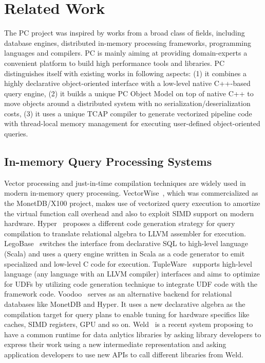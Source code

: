 
\section{Related Work}

The PC project was inspired by works from a broad class of
fields, including database engines, distributed in-memory processing
frameworks,  programming languages and compilers. PC is
mainly aiming at providing domain-experts a convenient platform to build high
performance tools and libraries. PC distinguishes itself with existing
works in following aspects:
(1) it combines a highly declarative object-oriented interface with a
low-level native
C++-based query engine, (2) it builds a unique PC Object Model on top of
native C++ to move objects around a distributed system with no
serialization/deserialization costs, (3) it uses a unique TCAP compiler to generate vectorized
pipeline code with thread-local memory management for executing
user-defined object-oriented queries.

\subsection {In-memory Query Processing Systems}
Vector processing and just-in-time compilation techniques are widely
used in modern in-memory query
processing. VectorWise~\cite{zukowski2012vectorwise}, which was
commercialized as the MonetDB/X100 project, makes use of vectorized
query execution to amortize the virtual function call overhead and
also to exploit SIMD support on modern hardware.
Hyper~\cite{neumann2011efficiently} proposes a different code
generation strategy for query compilation to translate relational
algebra to LLVM assembler for execution.
 LegoBase~\cite{klonatos2014building} switches the interface
from declarative SQL to high-level language (Scala) and uses a query engine
written in Scala as a code generator to emit specialized and low-level
C code for execution. TupleWare~\cite{crotty2015tupleware} supports
high-level language (any language with an LLVM compiler) interfaces
and aims to
optimize for UDFs by utilizing code
generation technique to integrate UDF code with the framework
code. Voodoo~\cite{pirk2016voodoo} serves as an alternative backend for
relational databases like MonetDB and Hyper. It uses a new
declarative algebra as the compilation target for query plans to
enable tuning for hardware specifics like caches, SIMD registers,
GPU and so on. Weld~\cite{palkar2017weld} is a recent system proposing
to have a common runtime for data anlytics libraries by asking library
developers to express their work using a new intermediate
representation and asking application developers to use new APIs to
call different libraries from Weld.  

